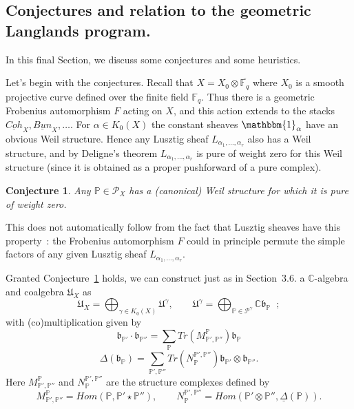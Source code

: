 \documentclass[a4paper,10pt]{amsart}
\def\a{\alpha}
\def\C{\mathbb{C}}
\def\fqb{\overline{\mathbb{F}_q}}
\def\bo{\mathfrak{b}}
\newtheorem{conj}[theo]{Conjecture}
\numberwithin{equation}{section}
\begin{document}
\subsection{Conjectures and relation to the geometric Langlands program.}

\vspace{.15in}

In this final Section, we discuss some conjectures and some heuristics. 

\vspace{.1in}

Let's begin with the conjectures. Recall that $X=X_0 \otimes \fqb$ where $X_0$ is a smooth projective curve defined over the finite field $\mathbb{F}_q$. Thus there is a geometric Frobenius automorphism $F$ acting on $X$, and this action extends to the stacks $\underline{Coh}_X, \underline{Bun}_X,\ldots$. For $\a \in K_0(X)$ the constant sheaves $\mathbbm{1}_{\a}$ have an obvious Weil structure. Hence any Lusztig sheaf $L_{\a_1, \ldots, \a_r}$ also has a Weil structure, and by Deligne's theorem $L_{\a_1, \ldots, \a_r}$ is pure of weight zero for this Weil structure (since it is obtained as a proper pushforward of a pure complex).

\vspace{.1in}

\begin{conj}\label{C:one} Any $\mathbb{P} \in \mathcal{P}_X$ has a (canonical) Weil structure for which it is pure of weight zero.
\end{conj}

This does not automatically follow from the fact that Lusztig sheaves have this property~: the Frobenius automorphism $F$ could in principle permute the simple factors of any given Lusztig sheaf $L_{\a_1, \ldots, \a_r}$.

\vspace{.1in}

Granted Conjecture~\ref{C:one} holds, we can construct just as in Section~3.6. a $\C$-algebra and coalgebra $\mathfrak{U}_{X}$ as 
$$\mathfrak{U}_{X}=\bigoplus_{\gamma \in K_0(X)} \mathfrak{U}^{\gamma}, \qquad 
\mathfrak{U}^{\gamma}=\bigoplus_{\mathbb{P} \in \mathcal{P}^{\gamma}} \C \bo_{\mathbb{P}}\;\;;$$
with (co)multiplication given by
$$\bo_{\mathbb{P}'} \cdot \bo_{\mathbb{P}''}=\sum_{\mathbb{P}} Tr(M_{\mathbb{P}', \mathbb{P}''}^{\mathbb{P}}) \bo_{\mathbb{P}}$$
$$\Delta(\bo_{\mathbb{P}})=\sum_{\mathbb{P}',\mathbb{P}''} Tr(N^{\mathbb{P}', \mathbb{P}''}_{\mathbb{P}}) \bo_{\mathbb{P}'} \otimes \bo_{\mathbb{P}''}.$$
Here $M_{\mathbb{P}', \mathbb{P}''}^{\mathbb{P}}$ and $N^{\mathbb{P}', \mathbb{P}''}_{\mathbb{P}}$ are the structure complexes defined by
$$M_{\mathbb{P}', \mathbb{P}''}^{\mathbb{P}}= Hom(\mathbb{P} ,\mathbb{P}' \star \mathbb{P}''), \qquad
N^{\mathbb{P}', \mathbb{P}''}_{\mathbb{P}}= Hom(\mathbb{P}' \otimes \mathbb{P}'', \underline{\Delta}(\mathbb{P})).$$
\end{document}
